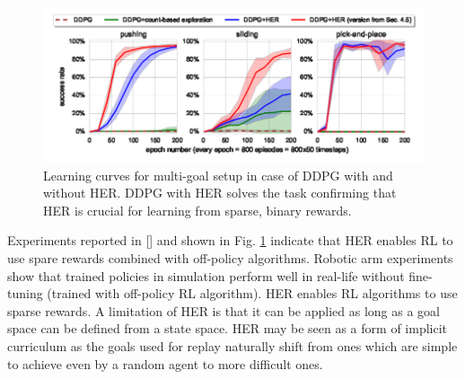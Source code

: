 \documentclass[conference]{IEEEtran}
\begin{document}
\begin{figure}[ht]
\centering
\includegraphics[width=0.9\columnwidth]{img/HER_robotic_experiments.png}
\caption{Learning curves for multi-goal setup in case of DDPG with and without HER. DDPG with HER solves the task confirming that HER is crucial for learning from sparse, binary rewards.}
\label{fig:her_robot_experiment}
\end{figure}
Experiments reported in [\cite{andrychowicz2017hindsight}] and shown in Fig. \ref{fig:her_robot_experiment} indicate that HER enables RL to use spare rewards combined with off-policy algorithms. Robotic arm experiments show that trained policies in simulation perform well in real-life without fine-tuning (trained with off-policy RL algorithm).
HER enables RL algorithms to use sparse rewards. A limitation of HER is that it can be applied as long as a goal space can be defined from a state space. HER may be seen as a form of implicit curriculum as the goals used for replay naturally shift from ones which are simple to achieve even by a random agent to more difficult ones.
\end{document}
